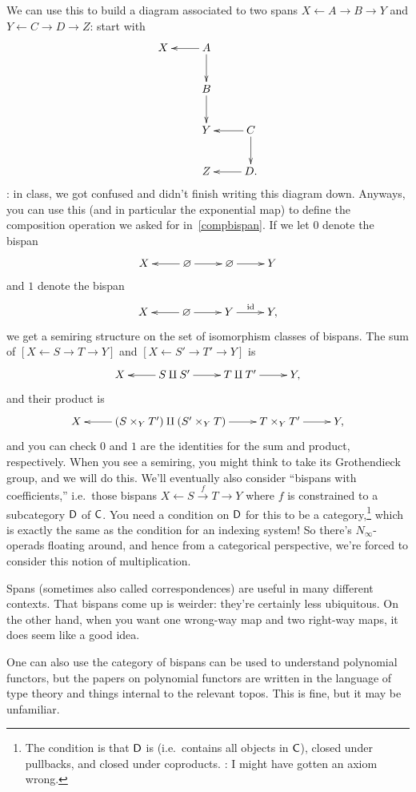 We can use this to build a diagram associated to two spans $X\gets A\to B\to Y$ and $Y\gets C\to D\to Z$: start
with
\begin{equation}
\label{snake}
\gathxy{
	X & A\ar[l]\ar[d]\\
	& B\ar[d]\\
	& Y & C\ar[l]\ar[d]\\
	& Z & D.\ar[l]
}
\end{equation}
\TODO: in class, we got confused and didn't finish writing this diagram down. Anyways, you can use this (and in
particular the exponential map) to define the composition operation we asked for in~\eqref{compbispan}.
If we let $0$ denote the bispan
\[\xymatrix{
	X & \emptyset\ar[l]\ar[r] & \emptyset\ar[r] & Y
}\]
and $1$ denote the bispan
\[\xymatrix{
	X & \emptyset\ar[l]\ar[r] & Y\ar[r]^\id & Y,
}\]
we get a semiring structure on the set of isomorphism classes of bispans. The sum of $[X\gets S\to T\to Y]$ and
$[X\gets S'\to T'\to Y]$ is
\[\xymatrix{
	X & S\amalg S'\ar[l]\ar[r] & T\amalg T'\ar[r] & Y,
}\]
and their product is
\[\xymatrix{
	X & (S\times_Y T') \amalg (S'\times_Y T)\ar[l]\ar[r] & T\times_Y T'\ar[r] & Y,
}\]
and you can check $0$ and $1$ are the identities for the sum and product, respectively. When you see a semiring,
you might think to take its Grothendieck group, and we will do this. We'll eventually also consider ``bispans with
coefficients,'' i.e.\ those bispans $X\gets S\stackrel f\to T\to Y$ where $f$ is constrained to a subcategory $\mathsf D$
of $\mathsf C$. You need a condition on $\mathsf D$ for this to be a category,\footnote{The condition is that $\mathsf D$ is
 (i.e.\ contains all objects in $\mathsf C$), closed under pullbacks, and closed under coproducts. \TODO: I
might have gotten an axiom wrong.} which is exactly the same as the condition for an indexing system! So there's
$N_\infty$-operads floating around, and hence from a categorical perspective, we're forced to consider this notion
of multiplication.

\begin{rem}
Spans (sometimes also called correspondences) are useful in many different contexts. That bispans come up is
weirder: they're certainly less ubiquitous. On the other hand, when you want one wrong-way map and two right-way
maps, it does seem like a good idea.
\end{rem}
One can also use the category of bispans can be used to understand polynomial functors, but the papers on
polynomial functors are written in the language of type theory and things internal to the relevant topos. This is
fine, but it may be unfamiliar.


